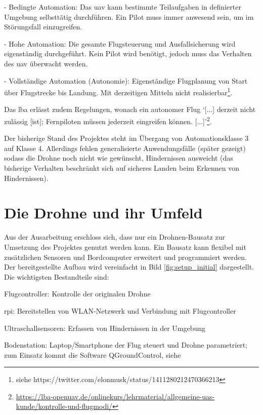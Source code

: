 \begin{compactenum}[{Level} 1]
    \setcounter{enumi}{2}
	\item - Bedingte Automation: Das \gls{uav} kann bestimmte Teilaufgaben in definierter Umgebung selbsttätig durchführen. Ein Pilot muss immer anwesend sein, um im Störungsfall einzugreifen.
	\item - Hohe Automation: Die gesamte Flugsteuerung und Ausfallsicherung wird eigenständig durchgeführt. Kein Pilot wird benötigt, jedoch muss das Verhalten des \gls{uav} überwacht werden.
	\item - Vollständige Automation (Autonomie): Eigenständige Flugplanung von Start über Flugstrecke bis Landung. Mit derzeitigen Mitteln nicht realisierbar\footnote{siehe https://twitter.com/elonmusk/status/1411280212470366213}.
\end{compactenum}

Das \gls{lba} erlässt zudem Regelungen, wonach ein autonomer Flug \enquote*{[...] derzeit nicht zulässig [ist]; Fernpiloten müssen jederzeit eingreifen können. [...]}\footnote{\url{https://lba-openuav.de/onlinekurs/lehrmaterial/allgemeine-uas-kunde/kontrolle-und-flugmodi/}}.  

Der bisherige Stand des Projektes steht im Übergang von Automationsklasse 3 auf Klasse 4. Allerdings fehlen generalisierte Anwendungsfälle (später gezeigt) sodass die Drohne noch nicht wie gewünscht, Hindernissen ausweicht (das bisherige Verhalten beschränkt sich auf sicheres Landen beim Erkennen von Hindernissen).

\section{Die Drohne und ihr Umfeld}
Aus der Ausarbeitung erschloss sich, dass nur ein Drohnen-Bausatz zur Umsetzung des Projektes genutzt werden kann. Ein Bausatz kann flexibel mit zusätzlichen Sensoren und Bordcomputer erweitert und programmiert werden. Der bereitgestellte Aufbau wird vereinfacht in Bild \ref{fig:setup_initial} dargestellt. Die wichtigsten Bestandteile sind:
\begin{compactdesc}
	\item[Flugcontroller:] Kontrolle der originalen Drohne
	\item[\gls{rpi}:] Bereitstellen von WLAN-Netzwerk und Verbindung mit Flugcontroller
	\item[Ultraschallsensoren:] Erfassen von Hindernissen in der Umgebung
	\item[Bodenstation:] Laptop/Smartphone der Flug steuert und Drohne parametriert; zum Einsatz kommt die Software QGroundControl, siehe \cite[Kapitel 4.3.5]{wirthErweiterungBestehendenDrohne2022}
\end{compactdesc}

